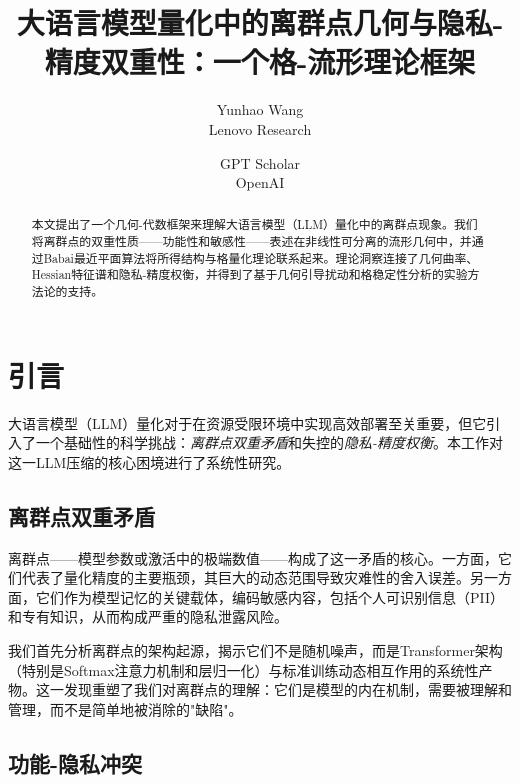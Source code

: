 \documentclass[letterpaper,twocolumn,10pt]{article}
\begin{document}
\title{\Large\textbf{大语言模型量化中的离群点几何与隐私-精度双重性：一个格-流形理论框架}}

\author{
{\rm Yunhao Wang}\\
Lenovo Research
\and
{\rm GPT Scholar}\\
OpenAI
} %

\maketitle
\begin{abstract}
本文提出了一个几何-代数框架来理解大语言模型（LLM）量化中的离群点现象。我们将离群点的双重性质——功能性和敏感性——表述在非线性可分离的流形几何中，并通过Babai最近平面算法将所得结构与格量化理论联系起来。理论洞察连接了几何曲率、Hessian特征谱和隐私-精度权衡，并得到了基于几何引导扰动和格稳定性分析的实验方法论的支持。
\end{abstract}

\section{引言}

大语言模型（LLM）量化对于在资源受限环境中实现高效部署至关重要，但它引入了一个基础性的科学挑战：\emph{离群点双重矛盾}和失控的\emph{隐私-精度权衡}。本工作对这一LLM压缩的核心困境进行了系统性研究。

\subsection{离群点双重矛盾}

离群点——模型参数或激活中的极端数值——构成了这一矛盾的核心。一方面，它们代表了量化精度的主要瓶颈，其巨大的动态范围导致灾难性的舍入误差。另一方面，它们作为模型记忆的关键载体，编码敏感内容，包括个人可识别信息（PII）和专有知识，从而构成严重的隐私泄露风险。

我们首先分析离群点的架构起源，揭示它们不是随机噪声，而是Transformer架构（特别是Softmax注意力机制和层归一化）与标准训练动态相互作用的系统性产物。这一发现重塑了我们对离群点的理解：它们是模型的内在机制，需要被理解和管理，而不是简单地被消除的"缺陷"。

\subsection{功能-隐私冲突}
\end{document}
